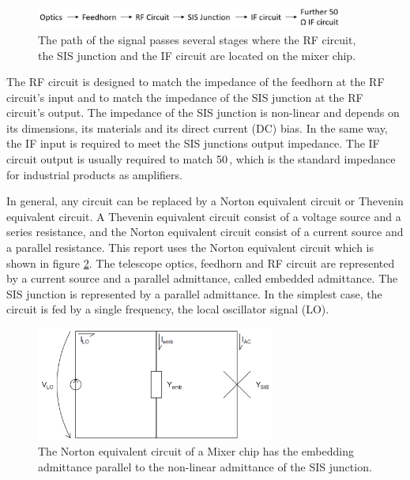 \documentclass[]{article}
\begin{document}
\begin{figure}
	\centering
	\includegraphics[width=0.9\textwidth]{./Images/Signal_Path.PNG}
	\caption{The path of the signal passes several stages where the RF circuit, the SIS junction and the IF circuit are located on the mixer chip.}
	\label{fig:Signal_Path}
\end{figure}

The RF circuit is designed to match the impedance of the feedhorn at the RF circuit's input and to match the impedance of the SIS junction at the RF circuit's output. The impedance of the SIS junction is non-linear and depends on its dimensions, its materials and its direct current (DC) bias. In the same way, the IF input is required to meet the SIS junctions output impedance. The IF circuit output is usually required to match 50\,\textOmega, which is the standard impedance for industrial products as amplifiers.

%
%
%

In general, any circuit can be replaced by a Norton equivalent circuit or Thevenin equivalent circuit. A Thevenin equivalent circuit consist of a voltage source and a series resistance, and the Norton equivalent circuit consist of a current source and a parallel resistance. 
This report uses the Norton equivalent circuit which is shown in figure \ref{fig:NortonEquivalentCircuit}. The telescope optics, feedhorn and RF circuit are represented by a current source and a parallel admittance, called embedded admittance. The SIS junction is represented by a parallel admittance. 
In the simplest case, the circuit is fed by a single frequency, the local oscillator signal (LO).

\begin{figure}
	\centering
	\includegraphics[width=0.7\textwidth]{./Images/Norton_Equivalent_Circuit.PNG}
	\caption{The Norton equivalent circuit of a Mixer chip has the embedding admittance parallel to the non-linear admittance of the SIS junction.}
	\label{fig:NortonEquivalentCircuit}
\end{figure}
\end{document}
